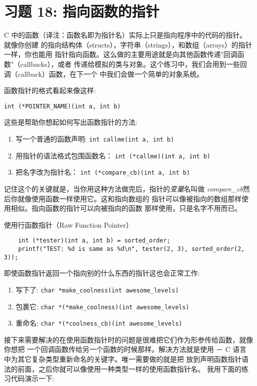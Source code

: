 \chapter{习题 18: 指向函数的指针}

C 中的函数（译注：函数名即为指针名）实际上只是指向程序中的代码的指针。就像你创建
的指向结构体（structs），字符串（strings），和数组（arrays）的指针一样，你也能用
指针指向函数。这么做的主要用途就是向其他函数传递"回调函数"（callbacks），或者
传递给模拟的类与对象。这个练习中，我们会用到一些回调（callback）函数，在下一个
中我们会做一个简单的对象系统。

函数指针的格式看起来像这样:

\verb|int (*POINTER_NAME)(int a, int b)|

这些是帮助你想起如何写出函数指针的方法:

\begin{enumerate}
\item 写一个普通的函数声明: \verb|int callme(int a, int b)|
\item 用指针的语法格式包围函数名： \verb|int (*callme)(int a, int b)|
\item 把名字改为指针名： \verb|int (*compare_cb)(int a, int b)|
\end{enumerate}

记住这个的关键就是，当你用这种方法做完后，指针的\emph{变量}名叫做 
\emph{compare\_cb}然后你就像使用函数一样使用它。这和指向数组的
指针可以像被指向的数组那样使用相似。指向函数的指针可以向被指向的函数
那样使用，只是名字不用而已。

\begin{code}{使用行函数指针（Raw Function Pointer）}
\begin{lstlisting}
    int (*tester)(int a, int b) = sorted_order;
    printf("TEST: %d is same as %d\n", tester(2, 3), sorted_order(2, 3)); 
\end{lstlisting}
\end{code}

即使函数指针返回一个指向别的什么东西的指针这也会正常工作:

\begin{enumerate}
\item 写下了: \verb|char *make_coolness(int awesome_levels)|
\item 包裹它: \verb|char *(*make_coolness)(int awesome_levels)|
\item 重命名: \verb|char *(*coolness_cb)(int awesome_levels)|
\end{enumerate}

接下来需要解决的在使用函数指针时的问题是很难把它们作为形参传给函数，就像你想把
一个回调函数传给另一个函数的时候那样。解决方法就是使用 － C 
语言中为其它复杂类型重新命名的关键字。唯一需要做的就是把   
放到声明函数指针语法的前面，之后你就可以像使用一种类型一样的使用函数指针名。
我用下面的练习代码演示一下:

